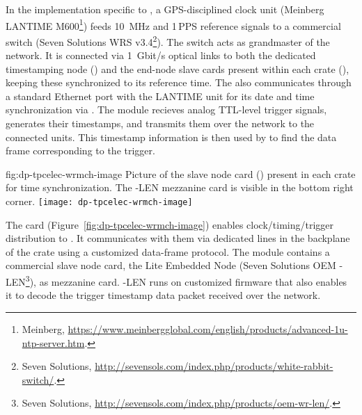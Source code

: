 In the implementation specific to , a GPS-disciplined clock unit (Meinberg LANTIME M600\footnote{Meinberg\texttrademark{}, \url{https://www.meinbergglobal.com/english/products/advanced-1u-ntp-server.htm}.}) feeds \SI{10}{MHz} and \num{1}\,PPS reference signals to a commercial  switch (Seven Solutions WRS v3.4\footnote{Seven Solutions\texttrademark{}, \url{http://sevensols.com/index.php/products/white-rabbit-switch/}.}). The switch acts as grandmaster of the  network. It is connected via \SI{1}{Gbit/s} optical links to both the dedicated  timestamping node () and the  end-node slave cards present within each  crate (), keeping these synchronized to its reference time. The  also communicates through a standard Ethernet port with the LANTIME unit for its date and time synchronization via . The  module recieves analog TTL-level trigger signals, generates their timestamps, and transmits them over the  network to the connected  units. This timestamp information is then used by  to find the data frame corresponding to the trigger.  

\begin{dunefigure}{fig:dp-tpcelec-wrmch-image}
{Picture of the  slave node card () present in each  crate for time synchronization. The -LEN mezzanine card is visible in the bottom right corner.}
\texttt{[image: dp-tpcelec-wrmch-image]}
\end{dunefigure}

The  card (Figure~\ref{fig:dp-tpcelec-wrmch-image}) enables clock/timing/trigger distribution to . It communicates with them via dedicated lines in the backplane of the  crate using a customized data-frame protocol. The module contains a commercial  slave node card, the  Lite Embedded Node (Seven Solutions OEM -LEN\footnote{Seven Solutions\texttrademark{}, \url{http://sevensols.com/index.php/products/oem-wr-len/}.}), as mezzanine card. -LEN runs on customized firmware that also enables it to decode the trigger timestamp data packet received over the  network.

